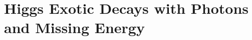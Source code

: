 \chapter{Higgs Exotic Decays with Photons and Missing Energy}
\graphicspath{{monophoton/figures/}{monophoton/}{monophoton/ggMET-4/}}





